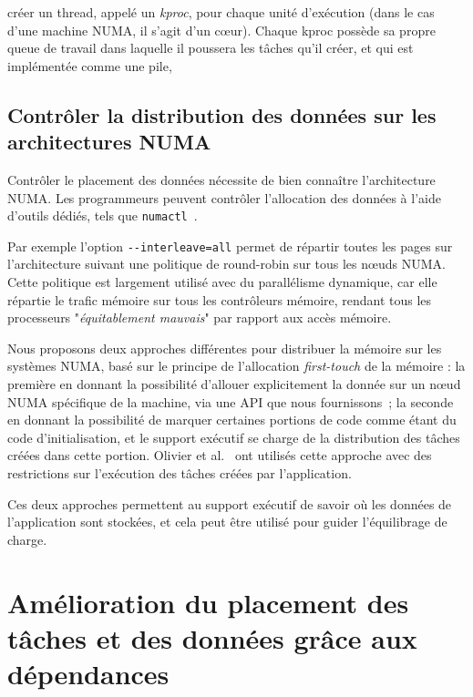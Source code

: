 \documentclass[parallelisme]{compas2016}
\begin{document}
\kaapi créer un thread, appelé un \emph{kproc}, pour chaque unité d'exécution
(dans le cas d'une machine NUMA, il s'agit d'un cœur).
Chaque kproc possède sa propre queue de travail dans laquelle il poussera les
tâches qu'il créer, et qui est implémentée comme une pile,

\vspace*{-1ex}
\subsection{Contrôler la distribution des données sur les architectures NUMA}

Contrôler le placement des données nécessite de bien connaître l'architecture NUMA.
Les programmeurs peuvent contrôler l'allocation des données à l'aide d'outils
dédiés, tels que \verb/numactl/~\cite{DBLP:journals/corr/abs-1101-0093}.

Par exemple l'option \verb/--interleave=all/ permet de répartir toutes les pages
sur l'architecture suivant une politique de round-robin sur tous les nœuds NUMA.
Cette politique est largement utilisé avec du parallélisme dynamique,
car elle répartie le trafic mémoire sur tous les contrôleurs mémoire, rendant
tous les processeurs "\emph{équitablement mauvais}" par rapport aux accès mémoire.

Nous proposons deux approches différentes pour distribuer la mémoire sur les systèmes
NUMA, basé sur le principe de l'allocation \emph{first-touch} de la mémoire : la première
en donnant la possibilité d'allouer explicitement la donnée sur un nœud NUMA
spécifique de la machine, via une API que nous fournissons~\cite{Durand2013,BroFurGogWacNam10IJPP};
la seconde en donnant la possibilité de marquer certaines portions de code comme
étant du code d'initialisation, et le support exécutif se charge de la distribution
des tâches créées dans cette portion.
Olivier et al.~\cite{Olivier:2012:CMW:2388996.2389085} ont utilisés cette
approche avec des restrictions sur l'exécution des tâches créées par l'application.

Ces deux approches permettent au support exécutif de savoir où les données
de l'application sont stockées, et cela peut être utilisé pour guider l'équilibrage de charge.



\vspace*{-1ex}
\section{Amélioration du placement des tâches et des données grâce aux dépendances}
\label{sec:contributions}
\end{document}
